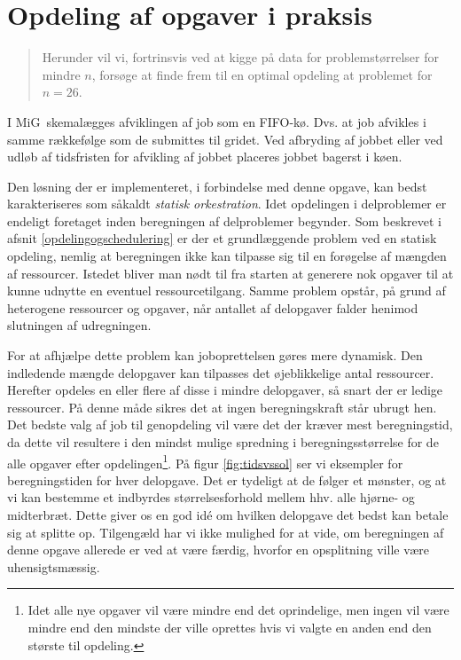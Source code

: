 \documentclass[draft,a4paper,11pt]{article}
\newcommand{\mig}{MiG}
\begin{document}
\section{Opdeling af opgaver i praksis}\label{opdelingipraksis}
\begin{verse}
	Herunder vil vi, fortrinsvis ved at kigge på data for problemstørrelser for mindre $n$, forsøge at finde frem til en optimal opdeling at problemet for $n=26$.
\end{verse}

I \mig\ skemalægges afviklingen af job som en FIFO-kø. Dvs. at job afvikles i samme rækkefølge som de submittes til gridet. Ved afbryding af jobbet eller ved udløb af tidsfristen for afvikling af jobbet placeres jobbet bagerst i køen. 

Den løsning der er implementeret, i forbindelse med denne opgave, kan bedst karakteriseres som såkaldt \emph{statisk orkestration}. Idet opdelingen i delproblemer er endeligt foretaget inden beregningen af delproblemer begynder. Som beskrevet i afsnit \ref{opdelingogschedulering} er der et grundlæggende problem ved en statisk opdeling, nemlig at beregningen ikke kan tilpasse sig til en forøgelse af mængden af ressourcer. Istedet bliver man nødt til fra starten at generere nok opgaver til at kunne udnytte en eventuel ressourcetilgang. Samme problem opstår, på grund af heterogene ressourcer og opgaver, når antallet af delopgaver falder henimod slutningen af udregningen. 

For at afhjælpe dette problem kan joboprettelsen gøres mere dynamisk. Den indledende mængde delopgaver kan tilpasses det øjeblikkelige antal ressourcer. Herefter opdeles en eller flere af disse i mindre delopgaver, så snart der er ledige ressourcer. På denne måde sikres det at ingen beregningskraft står ubrugt hen. 
Det bedste valg af job til genopdeling vil være det der kræver mest beregningstid, da dette vil resultere i den mindst mulige spredning i beregningsstørrelse for de alle opgaver efter opdelingen\footnote{Idet alle nye opgaver vil være mindre end det oprindelige, men ingen vil være mindre end den mindste der ville oprettes hvis vi valgte en anden end den største til opdeling.}. På figur \ref{fig:tidsvssol} ser vi eksempler for beregningstiden for hver delopgave. Det er tydeligt at de følger et mønster, og at vi kan bestemme et indbyrdes størrelsesforhold mellem hhv. alle hjørne- og midterbræt. Dette giver os en god idé om hvilken delopgave det bedst kan betale sig at splitte op. Tilgengæld har vi ikke mulighed for at vide, om beregningen af denne opgave allerede er ved at være færdig, hvorfor en opsplitning ville være uhensigtsmæssig. 
\end{document}
